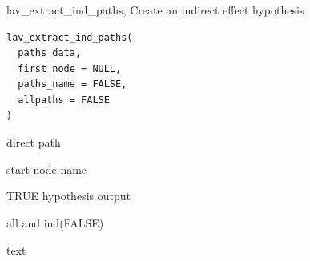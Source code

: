 \documentclass[a4paper]{book}
\begin{document}
%
\begin{Description}
lav\_extract\_ind\_paths, Create an indirect effect hypothesis
\end{Description}
%
\begin{Usage}
\begin{verbatim}
lav_extract_ind_paths(
  paths_data,
  first_node = NULL,
  paths_name = FALSE,
  allpaths = FALSE
)
\end{verbatim}
\end{Usage}
%
\begin{Arguments}
\begin{ldescription}
\item[\code{paths\_data}] direct path

\item[\code{first\_node}] start node name

\item[\code{paths\_name}] TRUE hypothesis output

\item[\code{allpaths}] all and ind(FALSE)
\end{ldescription}
\end{Arguments}
%
\begin{Value}
text
\end{Value}
%
\end{document}

